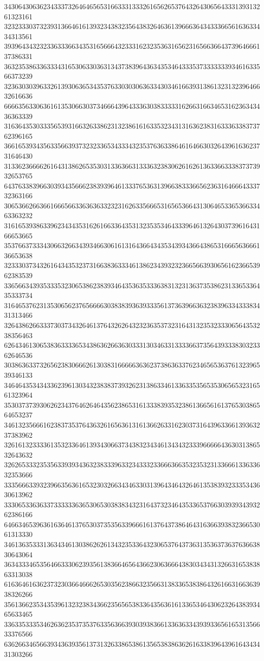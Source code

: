 34306430636234333732646465653166333133326165626537643264306564333139313261323161
32323330373239313664616139323438323564383264636139666364343336656163633434313561
39396434323233633366343531656664323331623235363165623165663664373964666137386331
36323538633633343165306330363134373839643634353464333537333333393461633566373239
32363030396332613930636534353763303030636334303461663931386132313239646632616636
66663563306361613530663037346664396433363038333331626631663465316236343436363339
31636435303335653931663263386231323861616335323431316362383163336338373762396165
36616539343563356639373232336534333432353763633864616466303264396163623731646430
31336236666261643138626535303133636631333632383062616261363366333837373932653765
64376338396630393435666238393964613337653631396638333665623631646664333732363166
30653662663661666566336363633232316263356665316565366431306465336536633463363232
31616539386339623434353162616633643531323535346433396461326430373961643166653665
35376637333430663266343934663061613164366434353439343664386531666563666136653638
32333037343261643435323731663836333461386234393232366566393065616236653962383539
33656634393533353230653862383934643536353336383132313637353862313365336435333734
31646537623135306562376566663038383936393335613736396636323839633433383431313466
32643862663337303734326461376432626432323635373231643132353233306564353238356463
62643461306538363333653438636266363033313034633133336637356439333830323362646536
30386363373265623830666261303831666663636237386363376234656536376132396539346133
34646435343433623961303432383837393262313863346133633535653530656532316561323964
35303737393062623437646264643562386531613338393532386136656161376530386564653237
34613235666162383735376436326165636131613662633162303731643963366139363237383962
32616132333361353233646139343066373438323434613434323339666664363031386532643632
32626533323535633939343632383339633234333233666366353235323133666133633632353666
33356663393239663563616532303266343463303139643464326461353839323335343630613962
33306533636337333333636530653038383432316437323464353365376630393934393262386166
64663465396361636461376530373535633966616137643738646431636639383236653061313330
34613635333136343461303862626134323533643230653764373631353637363763663830643064
36343334653564663330623935613836646564366230636664383034343132663165383863313038
61636461636237323036646662653035623866323566313833653838643261663166363938326266
35613662353435396132323834366235656538336435636161336534643062326438393465633465
33633533353462636235373537633563663930393836613363633439393365616531356633376566
63626634656639343639356137313263386538613565383863626163383964396164343431303266
